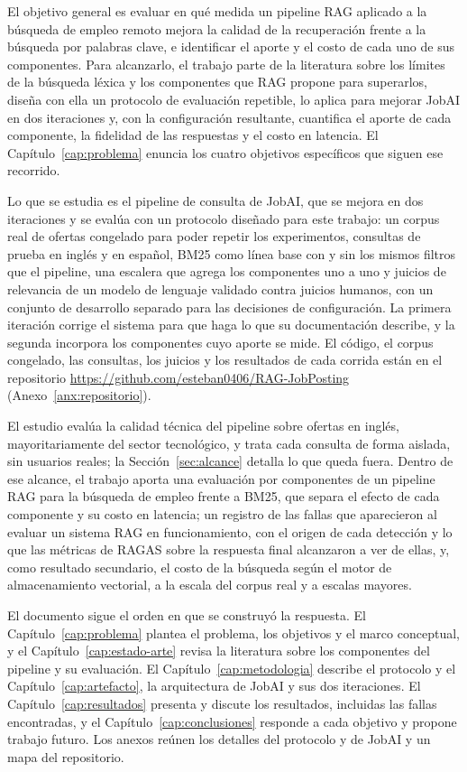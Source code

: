El objetivo general es evaluar en qué medida un pipeline RAG aplicado a la búsqueda de empleo remoto mejora la calidad de la recuperación frente a la búsqueda por palabras clave, e identificar el aporte y el costo de cada uno de sus componentes. Para alcanzarlo, el trabajo parte de la literatura sobre los límites de la búsqueda léxica y los componentes que RAG propone para superarlos, diseña con ella un protocolo de evaluación repetible, lo aplica para mejorar JobAI en dos iteraciones y, con la configuración resultante, cuantifica el aporte de cada componente, la fidelidad de las respuestas y el costo en latencia. El Capítulo~\ref{cap:problema} enuncia los cuatro objetivos específicos que siguen ese recorrido.

Lo que se estudia es el pipeline de consulta de JobAI, que se mejora en dos iteraciones y se evalúa con un protocolo diseñado para este trabajo: un corpus real de ofertas congelado para poder repetir los experimentos, consultas de prueba en inglés y en español, BM25 como línea base con y sin los mismos filtros que el pipeline, una escalera que agrega los componentes uno a uno y juicios de relevancia de un modelo de lenguaje validado contra juicios humanos, con un conjunto de desarrollo separado para las decisiones de configuración. La primera iteración corrige el sistema para que haga lo que su documentación describe, y la segunda incorpora los componentes cuyo aporte se mide. El código, el corpus congelado, las consultas, los juicios y los resultados de cada corrida están en el repositorio \url{https://github.com/esteban0406/RAG-JobPosting} (Anexo~\ref{anx:repositorio}).

El estudio evalúa la calidad técnica del pipeline sobre ofertas en inglés, mayoritariamente del sector tecnológico, y trata cada consulta de forma aislada, sin usuarios reales; la Sección~\ref{sec:alcance} detalla lo que queda fuera. Dentro de ese alcance, el trabajo aporta una evaluación por componentes de un pipeline RAG para la búsqueda de empleo frente a BM25, que separa el efecto de cada componente y su costo en latencia; un registro de las fallas que aparecieron al evaluar un sistema RAG en funcionamiento, con el origen de cada detección y lo que las métricas de RAGAS sobre la respuesta final alcanzaron a ver de ellas, y, como resultado secundario, el costo de la búsqueda según el motor de almacenamiento vectorial, a la escala del corpus real y a escalas mayores.

El documento sigue el orden en que se construyó la respuesta. El Capítulo~\ref{cap:problema} plantea el problema, los objetivos y el marco conceptual, y el Capítulo~\ref{cap:estado-arte} revisa la literatura sobre los componentes del pipeline y su evaluación. El Capítulo~\ref{cap:metodologia} describe el protocolo y el Capítulo~\ref{cap:artefacto}, la arquitectura de JobAI y sus dos iteraciones. El Capítulo~\ref{cap:resultados} presenta y discute los resultados, incluidas las fallas encontradas, y el Capítulo~\ref{cap:conclusiones} responde a cada objetivo y propone trabajo futuro. Los anexos reúnen los detalles del protocolo y de JobAI y un mapa del repositorio.
